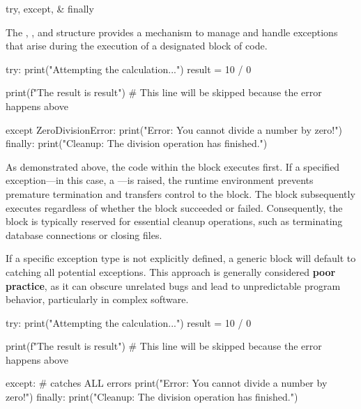 \documentclass[10pt]{article}
\begin{document}
    \begin{core}{try, except, \& finally}

      The , , and  structure provides a mechanism to manage and handle exceptions that arise during the execution of a designated block of code.

      \begin{pyconsole}

        try:
            print("Attempting the calculation...")
            result = 10 / 0
            
            print(f"The result is {result}") # This line will be skipped because the error happens above

        except ZeroDivisionError:
            print("Error: You cannot divide a number by zero!")
        finally:
            print("Cleanup: The division operation has finished.")

      \end{pyconsole}

      As demonstrated above, the code within the  block executes first. If a specified exception---in this case, a ---is raised, the runtime environment prevents premature termination and transfers control to the  block. The  block subsequently executes regardless of whether the  block succeeded or failed. Consequently, the  block is typically reserved for essential cleanup operations, such as terminating database connections or closing files.

      If a specific exception type is not explicitly defined, a generic  block will default to catching all potential exceptions. This approach is generally considered \textbf{poor practice}, as it can obscure unrelated bugs and lead to unpredictable program behavior, particularly in complex software.

      \begin{pyconsole}

        try:
            print("Attempting the calculation...")
            result = 10 / 0
            
            print(f"The result is {result}") # This line will be skipped because the error happens above

        except: # catches ALL errors
            print("Error: You cannot divide a number by zero!")
        finally:
            print("Cleanup: The division operation has finished.")


\end{pyconsole}
\end{core}
\end{document}
